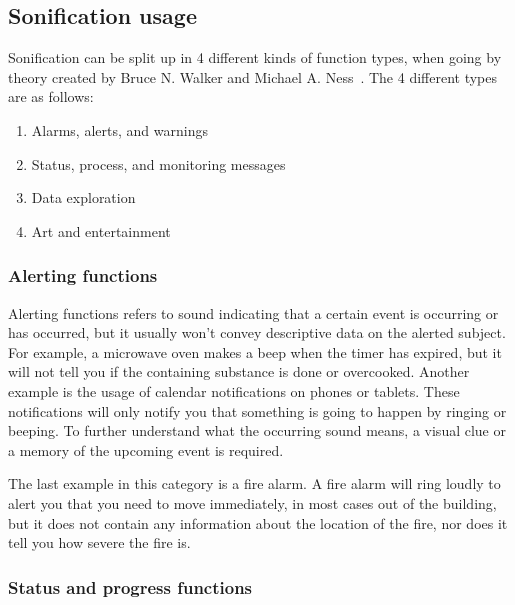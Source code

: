 \subsection{Sonification usage} %
\label{sub:sonification_usage}

Sonification can be split up in 4 different kinds of function types, when going by theory created by Bruce N. Walker and Michael A. Ness~\cite*{walker2011}. 
The 4 different types are as follows: 

\begin{enumerate}
    \item Alarms, alerts, and warnings
    \item Status, process, and monitoring messages
    \item Data exploration
    \item Art and entertainment
\end{enumerate}


\subsubsection*{Alerting functions} %
\label{ssub:alerting_functions}

Alerting functions refers to sound indicating that a certain event is occurring or has occurred, but it usually won’t convey descriptive data on the alerted subject. 
For example, a microwave oven makes a beep when the timer has expired, but it will not tell you if the containing substance is done or overcooked. 
Another example is the usage of calendar notifications on phones or tablets. 
These notifications will only notify you that something is going to happen by ringing or beeping. 
To further understand what the occurring sound means, a visual clue or a memory of the upcoming event is required.

The last example in this category is a fire alarm. 
A fire alarm will ring loudly to alert you that you need to move immediately, in most cases out of the building, but it does not contain any information about the location of the fire, nor does it tell you how severe the fire is.



\subsubsection*{Status and progress functions} %
\label{ssub:status_and_progress_functions}

